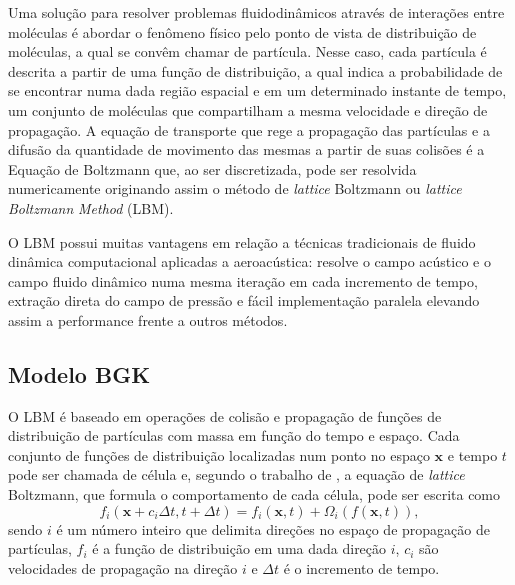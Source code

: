 Uma solução para resolver problemas fluidodinâmicos através de interações entre moléculas é abordar o fenômeno físico pelo ponto de vista de distribuição de moléculas, a qual se convêm chamar de partícula. Nesse caso, cada partícula é descrita a partir de uma função de distribuição, a qual indica a probabilidade de se encontrar numa dada região espacial e em um determinado instante de tempo, um conjunto de moléculas que compartilham a mesma velocidade e direção de propagação. A equação de transporte que rege a propagação das partículas e a difusão da quantidade de movimento das mesmas a partir de suas colisões é a Equação de Boltzmann que, ao ser discretizada, pode ser resolvida numericamente originando assim o método de \textit{lattice} Boltzmann ou \textit{lattice} \textit{Boltzmann} \textit{Method} (LBM). 

O LBM possui muitas vantagens em relação a técnicas tradicionais de fluido dinâmica computacional aplicadas a aeroacústica: resolve o campo acústico e o campo fluido dinâmico numa mesma iteração em cada incremento de tempo, extração direta do campo de pressão e fácil implementação paralela elevando assim a performance frente a outros métodos.

\subsection{Modelo BGK}

O LBM é baseado em operações de colisão e propagação de funções de distribuição de partículas com massa em função do tempo e espaço. Cada conjunto de funções de distribuição localizadas num ponto no espaço $\textbf{x}$ e tempo $t$ pode ser chamada de célula e, segundo o trabalho de , a equação de \textit{lattice} Boltzmann, que formula o comportamento de cada célula, pode ser escrita como 
\begin{equation}
	f_{i}(\textbf{x} + c_{i}\Delta t, t + \Delta t) = f_{i}(\textbf{x}, t) + \Omega_{i}(f(\textbf{x}, t)),
    \label{eq:f_i}
\end{equation}
sendo $i$ é um número inteiro que delimita direções no espaço de propagação de partículas, $f_{i}$ é a função de distribuição em uma dada direção $i$, $c_{i}$ são velocidades de propagação na direção $i$ e $\Delta t$ é o incremento de tempo. 

